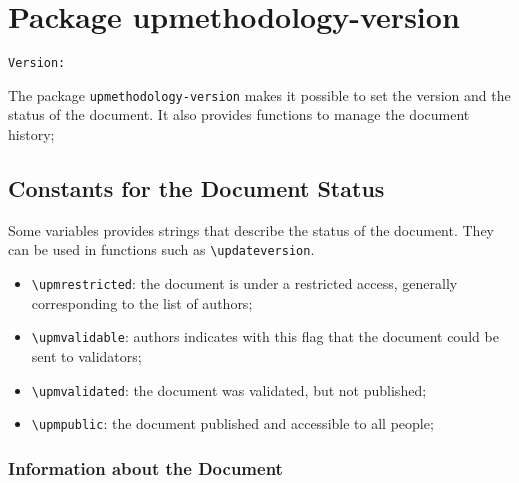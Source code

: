 \documentclass[book]{upmethodology-document}
\makeatletter
\let\VERversion\upm@package@version@ver
\makeatother
\begin{document}

\chapter{Package upmethodology-version}

\begin{center}
	\texttt{Version: \VERversion}
\end{center}

The package \texttt{upmethodology-version} makes it possible to set the version and the status of the document. It also provides functions to manage the document history;

\section{Constants for the Document Status}

Some \LaTeXe\xspace variables provides strings that describe the status of the document. They can be used in functions such as \texttt{{\textbackslash}updateversion}.
\begin{itemize}
\item \texttt{{\textbackslash}upmrestricted}: the document is under a restricted access, generally corresponding to the list of authors;
\item \texttt{{\textbackslash}upmvalidable}: authors indicates with this flag that the document could be sent to validators;
\item \texttt{{\textbackslash}upmvalidated}: the document was validated, but not published;
\item \texttt{{\textbackslash}upmpublic}: the document published and accessible to all people;
\end{itemize}

\subsection{Information about the Document}
\end{document}
